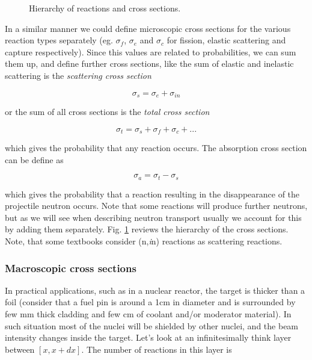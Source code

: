 
\begin{figure}[ht!]
\protect {}\protect
\caption{\label{fig:xshierarchy} \footnotesize{Hierarchy of reactions and cross sections.}}
\end{figure}

In a similar manner we could define microscopic cross sections for the various reaction types separately (eg. $\sigma_f$, $\sigma_e$ and $\sigma_c$ for fission, elastic scattering and capture respectively). Since this values are related to probabilities, we can sum them up, and define further cross sections, like the sum of elastic and inelastic scattering is the \textit{scattering cross section}

\[
\sigma_s=\sigma_e + \sigma_{in}
\]

or the sum of all cross sections is the \textit{total cross section}

\[
\sigma_t=\sigma_s + \sigma_{f}+ \sigma_{c} + ...
\]

which gives the probability that any reaction occurs. The absorption cross section can be define as 


\[
\sigma_a=\sigma_t - \sigma_s
\]

which gives the probability that a reaction resulting in the disappearance of the projectile neutron occurs. Note that some reactions will produce further neutrons, but as we will see when describing neutron transport usually we account for this by adding them separately. Fig. \ref{fig:xshierarchy} reviews the hierarchy of the cross sections. Note, that some textbooks consider (n,\textit{i}n) reactions as scattering reactions.

\subsubsection{Macroscopic cross sections}

In practical applications, such as in a nuclear reactor, the target is thicker than a foil (consider that a fuel pin is around a 1cm in diameter and is surrounded by few mm thick cladding and few cm of coolant and/or moderator material). In such situation most of the nuclei will be shielded by other nuclei, and the beam intensity changes inside the target. Let's look at an infinitesimally think layer between $[x,x+dx]$. The number of reactions in this layer is


